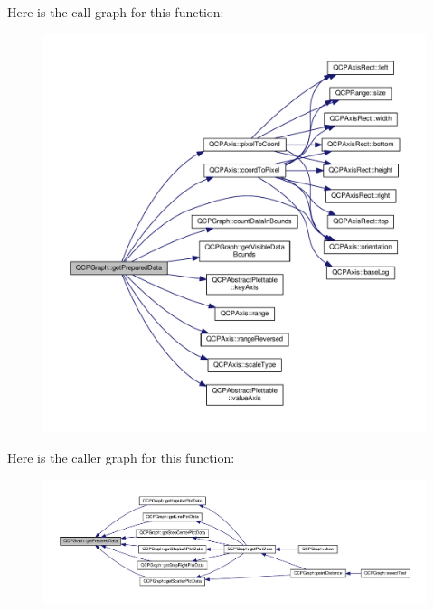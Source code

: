 Here is the call graph for this function\+:\nopagebreak
\begin{figure}[H]
\begin{center}
\leavevmode
\includegraphics[width=350pt]{class_q_c_p_graph_ab420b46ba638dc3252439fe16687b244_cgraph}
\end{center}
\end{figure}




Here is the caller graph for this function\+:\nopagebreak
\begin{figure}[H]
\begin{center}
\leavevmode
\includegraphics[width=350pt]{class_q_c_p_graph_ab420b46ba638dc3252439fe16687b244_icgraph}
\end{center}
\end{figure}


\hypertarget{class_q_c_p_graph_a45c4214b59ea11aa6d8d112bdc3b0e03}{}
